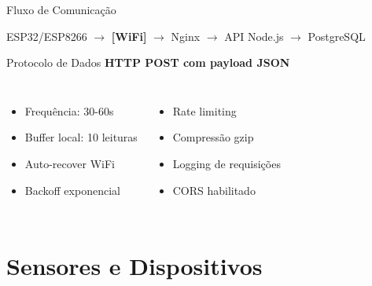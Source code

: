 \documentclass[12pt,aspectratio=16:9]{beamer}
\begin{document}
\begin{frame}{Fluxo de Comunicação}
    \begin{center}
        ESP32/ESP8266 $\rightarrow$ \textbf{[WiFi]} $\rightarrow$ Nginx $\rightarrow$ API Node.js $\rightarrow$ PostgreSQL
    \end{center}
    
    \vspace{1cm}
    
    \begin{block}{Protocolo de Dados}
        \textbf{HTTP POST com payload JSON}
    \end{block}
    
    \vspace{0.5cm}
    
    \begin{columns}
        \begin{itemize}
            \item Frequência: 30-60s
            \item Buffer local: 10 leituras
            \item Auto-recover WiFi
            \item Backoff exponencial
        \end{itemize}
        
        \begin{itemize}
            \item Rate limiting
            \item Compressão gzip
            \item Logging de requisições
            \item CORS habilitado
        \end{itemize}
    \end{columns}
\end{frame}

\section{Sensores e Dispositivos}
\end{document}
